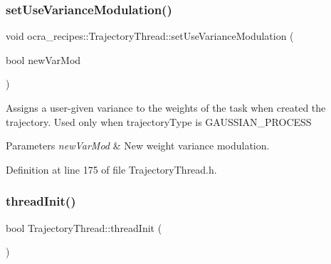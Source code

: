 \hypertarget{classocra__recipes_1_1TrajectoryThread_a230269a0ce3617e924a72b021adb6892}{}\label{classocra__recipes_1_1TrajectoryThread_a230269a0ce3617e924a72b021adb6892} 
\subsubsection{\texorpdfstring{set\+Use\+Variance\+Modulation()}{setUseVarianceModulation()}}
{\footnotesize\ttfamily void ocra\+\_\+recipes\+::\+Trajectory\+Thread\+::set\+Use\+Variance\+Modulation (\begin{DoxyParamCaption}\item[{bool}]{new\+Var\+Mod }\end{DoxyParamCaption})\hspace{0.3cm}{\ttfamily [inline]}}

Assigns a user-\/given variance to the weights of the task when created the trajectory. Used only when trajectory\+Type is G\+A\+U\+S\+S\+I\+A\+N\+\_\+\+P\+R\+O\+C\+E\+SS


\begin{DoxyParams}{Parameters}
{\em new\+Var\+Mod} & New weight variance modulation. \\
\hline
\end{DoxyParams}


Definition at line 175 of file Trajectory\+Thread.\+h.

\hypertarget{classocra__recipes_1_1TrajectoryThread_addd1165be15bc793294ad48486896377}{}\label{classocra__recipes_1_1TrajectoryThread_addd1165be15bc793294ad48486896377} 
\subsubsection{\texorpdfstring{thread\+Init()}{threadInit()}}
{\footnotesize\ttfamily bool Trajectory\+Thread\+::thread\+Init (\begin{DoxyParamCaption}{ }\end{DoxyParamCaption})\hspace{0.3cm}{\ttfamily [virtual]}}

